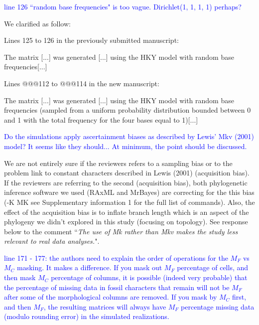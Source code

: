 \documentclass[11pt]{letter}
\begin{document}
\begin{letter}{}

\textcolor{blue}{line 126 ``random base frequencies" is too vague. Dirichlet(1, 1, 1, 1) perhaps?}

We clarified as follow:

Lines 125 to 126 in the previously submitted manuscript:

\hfill\begin{minipage}{\dimexpr\textwidth-1cm}
The matrix [...] was generated [...] using the HKY model with random base frequencies[...]
\end{minipage}

Lines @@@112 to @@@114 in the new manuscript:

\hfill\begin{minipage}{\dimexpr\textwidth-1cm}
The matrix [...] was generated [...] using the HKY model with random base frequencies (sampled from a uniform probability distribution bounded between 0 and 1 with the total frequency for the four bases equal to 1)[...]
\end{minipage}


\textcolor{blue}{Do the simulations apply ascertainment biases as described by Lewis' Mkv (2001) model? It seems like they should... At minimum, the point should be discussed.}

We are not entirely sure if the reviewers refers to a sampling bias or to the problem link to constant characters described in Lewis (2001) (acquisition bias). If the reviewers are referring to the second (acquisition bias), both phylogenetic inference software we used (RAxML and MrBayes) are correcting for the this bias (-K MK  see Supplementary information 1 for the full list of commands). Also, the effect of the acquisition bias is to inflate branch length which is an aspect of the phylogeny we didn't explored in this study (focusing on topology). See response below to the comment ``\textit{The use of Mk rather than Mkv makes the study less relevant to real data analyses.}".


\textcolor{blue}{line 171 - 177: the authors need to explain the order of operations for the $M_F$ vs $M_C$ masking. It makes a difference. If you mask out $M_F$ percentage of cells, and then mask $M_C$ percentage of columns, it is possible (indeed very probable) that the percentage of missing data in fossil characters that remain will not be $M_F$ after some of the morphological columns are removed. If you mask by $M_C$ first, and then $M_F$, the resulting matrices will always have $M_F$ percentage missing data (modulo rounding error) in the simulated realizations.}


\end{letter}
\end{document}
